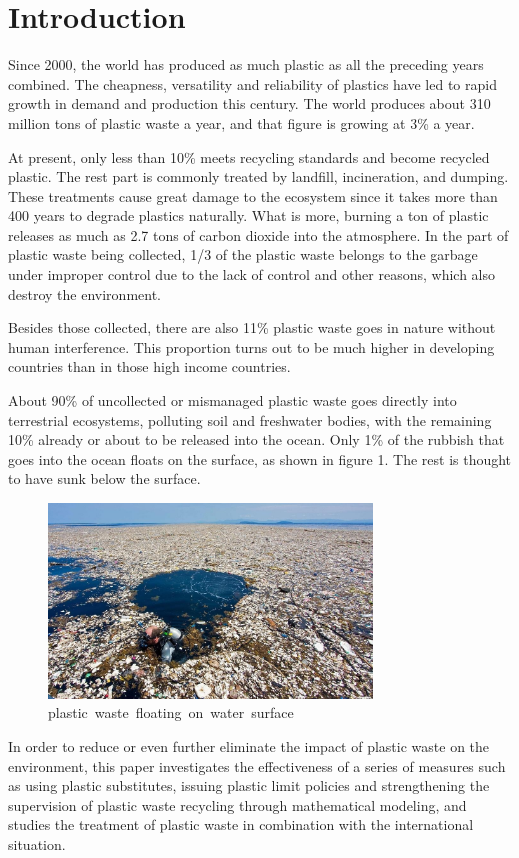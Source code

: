 \documentclass{mcmthesis}
\begin{document}
\maketitle


\tableofcontents
\newpage

\section{Introduction}
Since 2000, the world has produced as much plastic as all the preceding years combined. The cheapness, versatility and reliability of plastics have led to rapid growth in demand and production this century. The world produces about 310 million tons of plastic waste a year, and that figure is growing at 3\% a year.\par
At present, only less than 10\% meets recycling standards and become recycled plastic. The rest part is commonly treated by landfill, incineration, and dumping. These treatments cause great damage to the ecosystem since it takes more than 400 years to degrade plastics naturally. What is more, burning a ton of plastic releases as much as 2.7 tons of carbon dioxide into the atmosphere. In the part of plastic waste being collected, 1/3 of the plastic waste belongs to the garbage under improper control due to the lack of control and other reasons, which also destroy the environment.

Besides those collected, there are also 11\% plastic waste goes in nature without human interference. This proportion turns out to be much higher in developing countries than in those high income countries. 

About 90\% of uncollected or mismanaged plastic waste goes directly into terrestrial ecosystems, polluting soil and freshwater bodies, with the remaining 10\% already or about to be released into the ocean. Only 1\% of the rubbish that goes into the ocean floats on the surface, as shown in figure 1. The rest is thought to have sunk below the surface.
\begin{figure}[H]
	\centering
	\includegraphics[width=8.59cm,height=5.18cm]{figure/introduction.png}
   \caption{plastic waste floating on water surface}
\end{figure}
In order to reduce or even further eliminate the impact of plastic waste on the environment, this paper investigates the effectiveness of a series of measures such as using plastic substitutes, issuing plastic limit policies and strengthening the supervision of plastic waste recycling through mathematical modeling, and studies the treatment of plastic waste in combination with the international situation.
\end{document}
